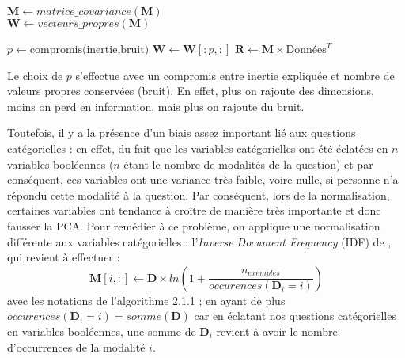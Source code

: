 \documentclass[11pt,fleqn,openany,frenchb]{book} %
\begin{document}
\begin{definition}
\begin{algorithm}[H]
 \BlankLine
 \BlankLine
 $\mathbf{M}\leftarrow matrice\_covariance(\mathbf{M})$\\
 $\mathbf{W}\leftarrow vecteurs\_propres(\mathbf{M})$\\
 \BlankLine

 $p \leftarrow  \textrm{compromis(inertie,bruit)}$  
 $\mathbf{W}\leftarrow \mathbf{W}[:p,:]$  
 $\mathbf{R}\leftarrow \mathbf{M} \times\textrm{Données}^T$\\
\label{alg:ACP}
\end{algorithm}

\end{definition}

Le choix de $p$ s'effectue avec un compromis entre inertie expliquée et nombre de valeurs propres conservées (bruit). En effet, plus on rajoute des dimensions, moins on perd en information, mais plus on rajoute du bruit.\par

Toutefois, il y a la présence d'un biais assez important lié aux questions catégorielles : en effet, du fait que les variables catégorielles ont été éclatées en $n$ variables booléennes ($n$ étant le nombre de modalités de la question) et par conséquent, ces variables ont une variance très faible, voire nulle, si personne n'a répondu cette modalité à la question. Par conséquent, lors de la normalisation, certaines variables ont tendance à croître de manière très importante et donc fausser la PCA. Pour remédier à ce problème, on applique une normalisation différente aux variables catégorielles : l'\textit{Inverse Document Frequency} (IDF) de \cite{sparckjones1972}, qui revient à effectuer : 
$$\mathbf{M}[i,:]\leftarrow \mathbf{D} \times ln \left(1+\frac{n_{exemples}}{occurences(\mathbf{D}_i=i)}\right)  $$
avec les notations de l'algorithme 2.1.1 ; en ayant de plus $occurences(\mathbf{D}_i=i)=somme(\mathbf{D})$ car en éclatant nos questions catégorielles en variables booléennes, une somme de $\mathbf{D}_i$ revient à avoir le nombre d'occurrences de la modalité $i$.
\end{document}
